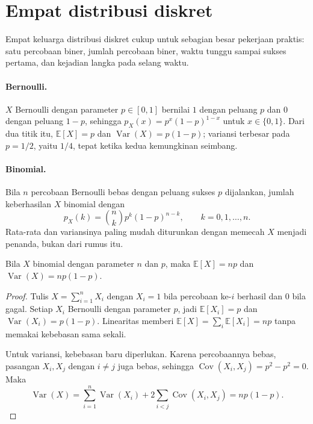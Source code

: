 
\section{Empat distribusi diskret}

Empat keluarga distribusi diskret cukup untuk sebagian besar pekerjaan praktis: satu
percobaan biner, jumlah percobaan biner, waktu tunggu sampai sukses pertama, dan
kejadian langka pada selang waktu.

\paragraph{Bernoulli.} $X$ Bernoulli dengan parameter $p\in[0,1]$ bernilai $1$ dengan
peluang $p$ dan $0$ dengan peluang $1-p$, sehingga $p_X(x)=p^x(1-p)^{1-x}$ untuk
$x\in\{0,1\}$. Dari dua titik itu, $\mathbb{E}[X]=p$ dan
$\operatorname{Var}(X)=p(1-p)$; variansi terbesar pada $p=1/2$, yaitu $1/4$, tepat
ketika kedua kemungkinan seimbang.

\paragraph{Binomial.} Bila $n$ percobaan Bernoulli bebas dengan peluang sukses $p$
dijalankan, jumlah keberhasilan $X$ binomial dengan
\[
p_X(k)=\binom{n}{k}p^k(1-p)^{n-k},\qquad k=0,1,\dots,n .
\]
Rata-rata dan variansinya paling mudah diturunkan dengan memecah $X$ menjadi penanda,
bukan dari rumus itu.

\begin{teorema}
Bila $X$ binomial dengan parameter $n$ dan $p$, maka
$\mathbb{E}[X]=np$ dan $\operatorname{Var}(X)=np(1-p)$.
\end{teorema}

\begin{proof}
Tulis $X=\sum_{i=1}^{n}X_i$ dengan $X_i=1$ bila percobaan ke-$i$ berhasil dan $0$ bila
gagal. Setiap $X_i$ Bernoulli dengan parameter $p$, jadi $\mathbb{E}[X_i]=p$ dan
$\operatorname{Var}(X_i)=p(1-p)$. Linearitas memberi
$\mathbb{E}[X]=\sum_i\mathbb{E}[X_i]=np$ tanpa memakai kebebasan sama sekali.

Untuk variansi, kebebasan baru diperlukan. Karena percobaannya bebas, pasangan
$X_i,X_j$ dengan $i\ne j$ juga bebas, sehingga
$\operatorname{Cov}(X_i,X_j)=p^2-p^2=0$. Maka
\[
\operatorname{Var}(X)=\sum_{i=1}^{n}\operatorname{Var}(X_i)
+2\sum_{i<j}\operatorname{Cov}(X_i,X_j)=np(1-p).
\]
\end{proof}

